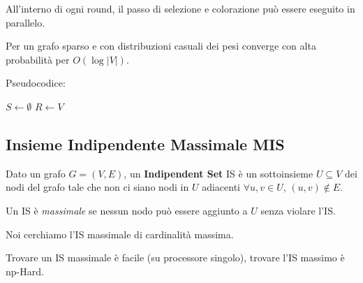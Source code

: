 All'interno di ogni round, il passo di selezione e colorazione può essere eseguito in parallelo. 

Per un grafo sparso e con distribuzioni casuali dei pesi converge con alta probabilità per $O(\log |V|)$.

Pseudocodice:
\begin{center}
    \begin{minipage}{.81\textwidth}
        \begin{tcolorbox}[
            colback=white,
            sharp corners,
            boxrule=.3mm,
            left=20pt,
            top=0pt,
            bottom=0pt,
            colbacktitle=white,
            coltitle=black
            ]
            \begin{algorithm}[H]
                \caption{Jones-Plassman Coloring}
                $S \leftarrow \emptyset$\;
                $R \leftarrow V$\;
            \end{algorithm}
        \end{tcolorbox}
    \end{minipage}
\end{center}

\subsection{Insieme Indipendente Massimale MIS}

Dato un grafo $G = (V,E)$, un \textbf{Indipendent Set} IS è un sottoinsieme $U \subseteq V$ dei nodi del grafo tale che non ci siano nodi in $U$ adiacenti $\forall u,v \in U$, $(u,v) \notin E$.

Un IS è \textit{massimale} se nessun nodo può essere aggiunto a $U$ senza violare l'IS.

Noi cerchiamo l'IS massimale di cardinalità massima.

Trovare un IS massimale è facile (su processore singolo), trovare l'IS massimo è np-Hard.

